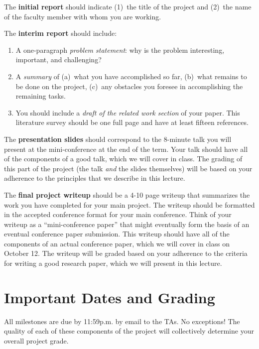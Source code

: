 \documentclass[11pt]{article}
\begin{document}
The {\bf initial report} should indicate (1)~the title of the project and
(2)~the name of the faculty member with whom you are working.

The {\bf interim report} should include:
\begin{enumerate}
\item A one-paragraph {\em problem statement}: why is the problem
  interesting, important, and challenging?
\item A {\em summary} of (a)~what you have accomplished so far, (b)~what
  remains to be done on the project, (c)~any obstacles you foresee in
  accomplishing the remaining tasks.
\item You should include a {\em draft of the related work section} of
  your paper.  This literature survey should be one full page and have
  at least fifteen references.
\end{enumerate}

The {\bf presentation slides} should correspond to the 8-minute talk you
will present at the mini-conference at the end of the term.  Your talk
should have all of the components of a good talk, which we will cover in
class.  The grading of this part of the project (the talk {\em and} the
slides themselves) will be based on your adherence to the principles
that we describe in this lecture.

The {\bf final project writeup} should be a 4-10 page writeup that
summarizes the work you have completed for your main project.  The
writeup should be formatted in the accepted conference format for your
main conference.  Think of your writeup as a ``mini-conference paper''
that might eventually form the basis of an eventual conference paper
submission.  This writeup should have all of the components of an actual
conference paper, which we will cover in class on October 12.  The
writeup will be graded based on your adherence to the criteria for
writing a good research paper, which we will present in this lecture.

\section{Important Dates and Grading}

All milestones are due by 11:59p.m. by email to the TAs.  No exceptions!
The quality of each of these components of the project will collectively
determine your overall project grade.

\end{document}
